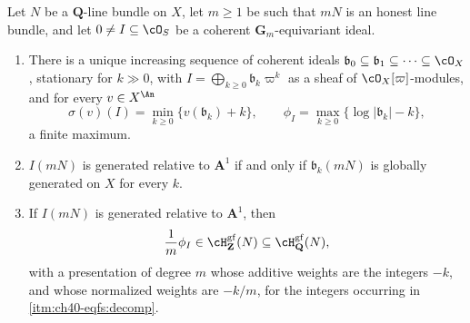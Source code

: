 \begin{lemma}
\label{lem:ch40-equivariant-ideal-fs}
Let $N$ be a $\mathbf Q$-line bundle on $X$, let $m\ge1$ be such
that $mN$ is an honest line bundle, and let $0\ne I\subseteq\cO_S$ be a
coherent $\mathbf G_m$-equivariant ideal.
\begin{enumerate}
\item\label{itm:ch40-eqfs:decomp}
 There is a unique increasing sequence of coherent ideals
 $\mathfrak b_0\subseteq\mathfrak b_1\subseteq\cdots\subseteq\cO_X$,
 stationary for $k\gg0$, with
 $I=\bigoplus_{k\ge0}\mathfrak b_k\varpi^k$ as a sheaf of
 $\cO_X[\varpi]$-modules, and for every $v\in X^{\An}$
 \[
   \sigma(v)(I)=\min_{k\ge0}\{v(\mathfrak b_k)+k\},
   \qquad
   \phi_I=\max_{k\ge0}\{\log|\mathfrak b_k|-k\},
 \]
 a finite maximum.
\item\label{itm:ch40-eqfs:gg}
 $I(mN)$ is generated relative to $\mathbf A^1$ if and only if
 $\mathfrak b_k(mN)$ is globally generated on $X$ for every $k$.
\item\label{itm:ch40-eqfs:fs}
 If $I(mN)$ is generated relative to $\mathbf A^1$, then
 \[
   \frac1m\phi_I\in\cH^{\mathrm{gf}}_{\mathbf Z}(N)
   \subseteq\cH^{\mathrm{gf}}_{\mathbf Q}(N),
 \]
 with a presentation of degree $m$ whose additive weights are the integers
 $-k$, and whose normalized weights are $-k/m$, for the integers occurring in
 \cref{itm:ch40-eqfs:decomp}.
\end{enumerate}
\end{lemma}

